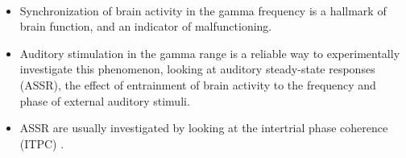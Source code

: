 \documentclass{beamer}
\newlength{\blockTwo}
\begin{document}
\begin{frame}[t]
\begin{textblock*}{\colwidth}


	\begin{block}{~}
		\begin{itemize}
		
			\item Synchronization of brain activity in the gamma frequency is a hallmark of brain function, and an indicator of malfunctioning\citep{pellegrino2019}.
   \item Auditory stimulation in the gamma range is a reliable way to experimentally investigate this phenomenon, looking at auditory steady-state responses  (ASSR), the effect of entrainment of brain activity to the frequency and phase  of external auditory stimuli.  
		 \item ASSR are usually investigated by looking at the intertrial phase coherence (ITPC) \citep{pellegrino2019}.	
		\end{itemize}	
		\end{block}
		

\end{textblock*}
	





	

\end{frame}
\end{document}
